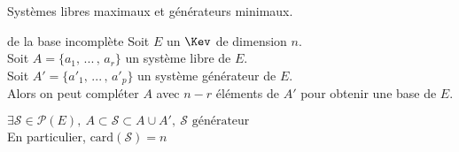 \documentclass[12pt,twoside,a4paper]{article}
\begin{document}
	\begin{preuve}
		Syst\`emes libres maximaux et g\'en\'erateurs minimaux.
	\end{preuve}
	\begin{theo}{de la base incompl\`ete}
		Soit $E$ un $\Kev$ de dimension $n$.\\
		Soit $A=\{a_1,\,...\,,\,a_r \}$ un syst\`eme libre de $E$.\\
		Soit $A'=\{a'_1,\,...\,,\,a'_p \}$ un syst\`eme g\'en\'erateur de $E$.\\
		Alors on peut compl\'eter $A$ avec $n-r$ \'el\'ements de $A'$ pour obtenir une base de $E$.
	\end{theo}
	\begin{preuve}
		$\exists \mathcal{S}\in \mathcal{P}(E),\ A\subset \mathcal{S}\subset A\cup A',\ \mathcal{S}\text{ g\'en\'erateur}$\\
		En particulier, $\mathrm{card}(\mathcal S)=n$
	\end{preuve}
\end{document}
